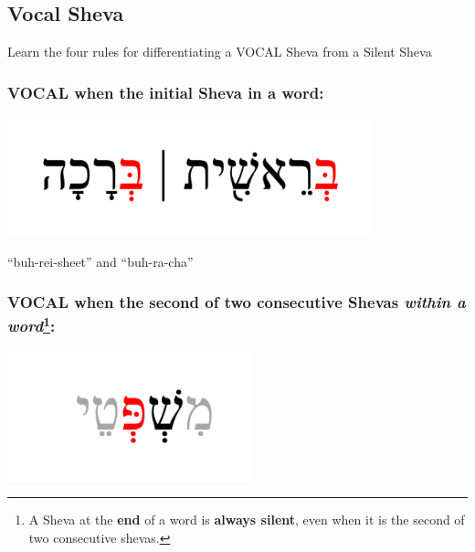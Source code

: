 \documentclass[
]{turabian-researchpaper}
\begin{document}
\hypertarget{three_4}{%
\subsection{Vocal Sheva}\label{three_4}}

Learn the four rules for differentiating a VOCAL Sheva from a Silent Sheva

\hypertarget{vocal-when-the-initial-sheva-in-a-word}{%
\subsubsection*{VOCAL when the initial Sheva in a word:}\label{vocal-when-the-initial-sheva-in-a-word}}

\begin{center}\includegraphics[width=300pt]{images/03.sheva-initialvocal} \end{center}

``buh-rei-sheet'' and ``buh-ra-cha''

\hypertarget{vocal-when-the-second-of-two-consecutive-shevas-within-a-word}{%
\subsubsection*{\texorpdfstring{VOCAL when the second of two consecutive Shevas \emph{within a word}\footnote{A Sheva at the \textbf{end} of a word is \textbf{always silent}, even when it is the second of two consecutive shevas.}:}{VOCAL when the second of two consecutive Shevas within a word:}}\label{vocal-when-the-second-of-two-consecutive-shevas-within-a-word}}

\begin{center}\includegraphics[width=200pt]{images/03.sheva-secondoftwovocal} \end{center}
\end{document}
